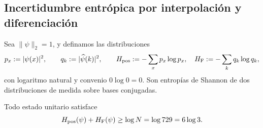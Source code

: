 \subsection{Incertidumbre entrópica por interpolación y diferenciación}
\label{v:n19:sec:entropia}

Sea \(\|\psi\|_2=1\), y definamos las distribuciones
\begin{equation}
 p_x:=|\psi(x)|^2,\qquad q_k:=|\widehat\psi(k)|^2,
 \qquad
 H_{\rm pos}:=-\sum_xp_x\log p_x,\quad
 H_{\rm F}:=-\sum_kq_k\log q_k,
 \label{v:n19:eq:entropias-distribucion}
\end{equation}
con logaritmo natural y convenio \(0\log0=0\). Son entropías de
Shannon de dos distribuciones de medida sobre bases conjugadas.

\begin{theorem}
\label{v:n19:thm:entropia}
Todo estado unitario satisface
\begin{equation}
 H_{\rm pos}(\psi)+H_{\rm F}(\psi)
 \ge\log N=\log729=6\log3.
 \label{v:n19:eq:cota-entropica}
\end{equation}
\end{theorem}
